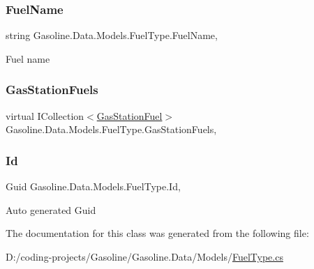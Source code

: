 \subsubsection{\texorpdfstring{FuelName}{FuelName}}
{\footnotesize\ttfamily string Gasoline.\+Data.\+Models.\+Fuel\+Type.\+Fuel\+Name\hspace{0.3cm}{\ttfamily [get]}, {\ttfamily [set]}}



Fuel name 

\mbox{\label{class_gasoline_1_1_data_1_1_models_1_1_fuel_type_a3e843fd296e101d1776d5503d5f6c77d}} 
\subsubsection{\texorpdfstring{GasStationFuels}{GasStationFuels}}
{\footnotesize\ttfamily virtual I\+Collection$<$\mbox{\hyperlink{class_gasoline_1_1_data_1_1_models_1_1_gas_station_fuel}{Gas\+Station\+Fuel}}$>$ Gasoline.\+Data.\+Models.\+Fuel\+Type.\+Gas\+Station\+Fuels\hspace{0.3cm}{\ttfamily [get]}, {\ttfamily [set]}}

\mbox{\label{class_gasoline_1_1_data_1_1_models_1_1_fuel_type_a7a41f8fae4838bbaea573dba3094ab61}} 
\subsubsection{\texorpdfstring{Id}{Id}}
{\footnotesize\ttfamily Guid Gasoline.\+Data.\+Models.\+Fuel\+Type.\+Id\hspace{0.3cm}{\ttfamily [get]}, {\ttfamily [set]}}



Auto generated Guid 



The documentation for this class was generated from the following file\+:\begin{DoxyCompactItemize}
\item 
D\+:/coding-\/projects/\+Gasoline/\+Gasoline.\+Data/\+Models/\mbox{\hyperlink{_fuel_type_8cs}{Fuel\+Type.\+cs}}\end{DoxyCompactItemize}

